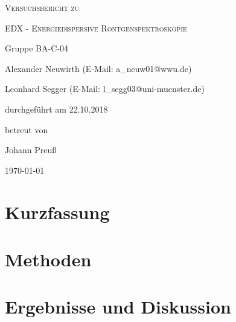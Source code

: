 \documentclass[
	a4paper,
	12pt,
	pagesize,
	ngerman
]{scrartcl}
\begin{document}
	
	\begin{titlepage}
		\centering
		{\scshape\LARGE Versuchsbericht zu \par}
		\vspace{1cm}
		{\scshape\huge EDX - Energiedispersive Röntgenspektroskopie \par}
		\vspace{2.5cm}
		{\LARGE Gruppe BA-C-04 \par}
		\vspace{0.5cm}
		
		{\large Alexander Neuwirth (E-Mail: a\_neuw01@wwu.de) \par}
		{\large Leonhard Segger (E-Mail: l\_segg03@uni-muenster.de) \par}
		\vfill
		
		durchgeführt am 22.10.2018\par
		betreut von\par
		{\large Johann Preuß} %
		
		\vfill
		
		{\large \today\par}
	\end{titlepage}
	\tableofcontents
	\newpage


	\section{Kurzfassung}
	
	
	
	\section{Methoden}
	
	
	\section{Ergebnisse und Diskussion}
	
\end{document}
